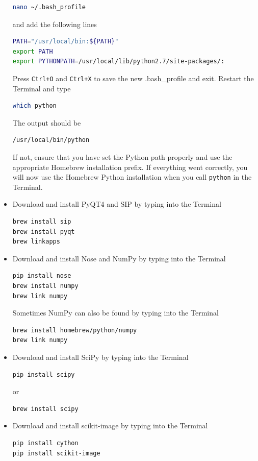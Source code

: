 \documentclass[a4paper,11pt]{article}
\begin{document}
\begin{itemize}
\begin{lstlisting}[frame=single,language=bash]
nano ~/.bash_profile
\end{lstlisting}
and add the following lines
\begin{lstlisting}[frame=single,language=bash]  
PATH="/usr/local/bin:${PATH}"
export PATH
export PYTHONPATH=/usr/local/lib/python2.7/site-packages/:
\end{lstlisting}
Press \verb-Ctrl+O- and \verb-Ctrl+X- to save the new .bash\_profile and exit. Restart the Terminal and type
\begin{lstlisting}[frame=single,language=bash]  
which python 
\end{lstlisting}
The output should be
\begin{lstlisting}[frame=single,language=bash]  
/usr/local/bin/python
\end{lstlisting}
If not, ensure that you have set the Python path properly and use the appropriate Homebrew installation prefix. If everything went correctly, you will now use the Homebrew Python installation when you call \verb+python+ in the Terminal.
\item Download and install PyQT4 and SIP by typing into the Terminal
\begin{lstlisting}[frame=single,language=bash]  
brew install sip
brew install pyqt
brew linkapps
\end{lstlisting}
\item Download and install Nose and NumPy by typing into the Terminal
\begin{lstlisting}[frame=single,language=bash]  
pip install nose
brew install numpy 
brew link numpy
\end{lstlisting}
Sometimes NumPy can also be found by typing into the Terminal
\begin{lstlisting}[frame=single,language=bash]  
brew install homebrew/python/numpy
brew link numpy
\end{lstlisting}
\item Download and install SciPy by typing into the Terminal
\begin{lstlisting}[frame=single,language=bash]  
pip install scipy
\end{lstlisting}
or 
\begin{lstlisting}[frame=single,language=bash]  
brew install scipy
\end{lstlisting}
\item Download and install scikit-image by typing into the Terminal
\begin{lstlisting}[frame=single,language=bash]  
pip install cython
pip install scikit-image
\end{lstlisting}

\end{itemize}
\end{document}
